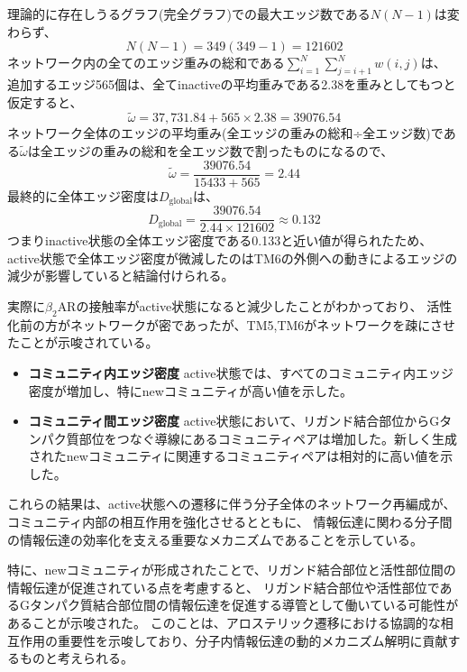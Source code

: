 理論的に存在しうるグラフ(完全グラフ)での最大エッジ数である$N(N-1)$は変わらず、
\begin{equation}
  N(N-1) = 349(349-1) = 121602
\end{equation}
ネットワーク内の全てのエッジ重みの総和である$\sum_{i=1}^{N} \sum_{j=i+1}^{N} w(i, j)$は、
追加するエッジ565個は、全てinactiveの平均重みである2.38を重みとしてもつと仮定すると、
\begin{equation}
  \tilde{\omega} = 37,731.84+565 \times 2.38 = 39076.54
\end{equation}
ネットワーク全体のエッジの平均重み(全エッジの重みの総和÷全エッジ数)である$\tilde{\omega}$は全エッジの重みの総和を全エッジ数で割ったものになるので、
\begin{equation}
  \tilde{\omega} = \frac{39076.54}{15433+565} = 2.44
\end{equation}
最終的に全体エッジ密度は$D_{\text{global}}$は、
\begin{equation}
  D_{\text{global}} = \frac{39076.54}{2.44 \times 121602} \approx 0.132
\end{equation}
つまりinactive状態の全体エッジ密度である0.133と近い値が得られたため、
active状態で全体エッジ密度が微減したのはTM6の外側への動きによるエッジの減少が影響していると結論付けられる。

実際に$\beta_2$ARの接触率がactive状態になると減少したことがわかっており\cite{Helmer2022}、
活性化前の方がネットワークが密であったが、TM5,TM6がネットワークを疎にさせたことが示唆されている。

\begin{itemize}
  \item \textbf{コミュニティ内エッジ密度}  
  active状態では、すべてのコミュニティ内エッジ密度が増加し、特にnewコミュニティが高い値を示した。
  \item \textbf{コミュニティ間エッジ密度}  
  active状態において、リガンド結合部位からGタンパク質部位をつなぐ導線にあるコミュニティペアは増加した。新しく生成されたnewコミュニティに関連するコミュニティペアは相対的に高い値を示した。
\end{itemize}


これらの結果は、active状態への遷移に伴う分子全体のネットワーク再編成が、
コミュニティ内部の相互作用を強化させるとともに、
情報伝達に関わる分子間の情報伝達の効率化を支える重要なメカニズムであることを示している。

特に、newコミュニティが形成されたことで、リガンド結合部位と活性部位間の情報伝達が促進されている点を考慮すると、
リガンド結合部位や活性部位であるGタンパク質結合部位間の情報伝達を促進する導管として働いている可能性があることが示唆された。
このことは、アロステリック遷移における協調的な相互作用の重要性を示唆しており、分子内情報伝達の動的メカニズム解明に貢献するものと考えられる。



